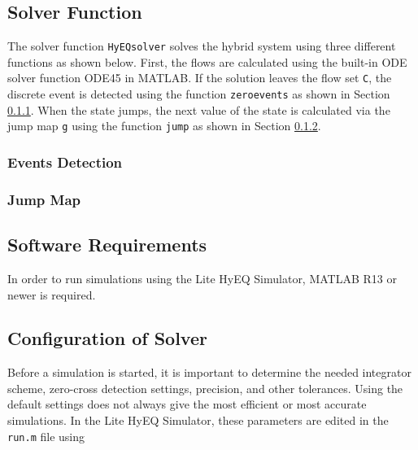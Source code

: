 \documentclass{article}
\newcommand{\ricardo}[1]{{\color{blue} #1}}
\begin{document}


\subsection{Solver Function}


The solver function {\tt HyEQsolver} solves the hybrid system using three different functions as shown below. First, the flows are calculated using the built-in ODE solver function ODE45 in MATLAB. If the solution leaves the flow set {\tt C}, the discrete event is detected using the function {\tt zeroevents} as shown in Section \ref{sec:eventsdetection}. When the state jumps, the next value of the state is calculated via the jump map {\tt g} using the function {\tt jump} as shown in Section \ref{sec:jumpmap}.\\

\label{scr:HyEQsolver}

\subsubsection{Events Detection}
\label{sec:eventsdetection}

\label{scr:zeroevents}

\subsubsection{Jump Map}
\label{sec:jumpmap}

\label{scr:jump}

\subsection{Software Requirements}

In order to run simulations using the Lite HyEQ Simulator, MATLAB R13 or newer is required.

\subsection{Configuration of Solver}

Before a simulation is started, it is important to determine the needed integrator scheme, zero-cross detection settings, precision, and other tolerances. Using the default settings does not always give the most efficient or most accurate simulations.
In the Lite HyEQ Simulator, these parameters are edited in the {\tt run.m} file using
\end{document}
